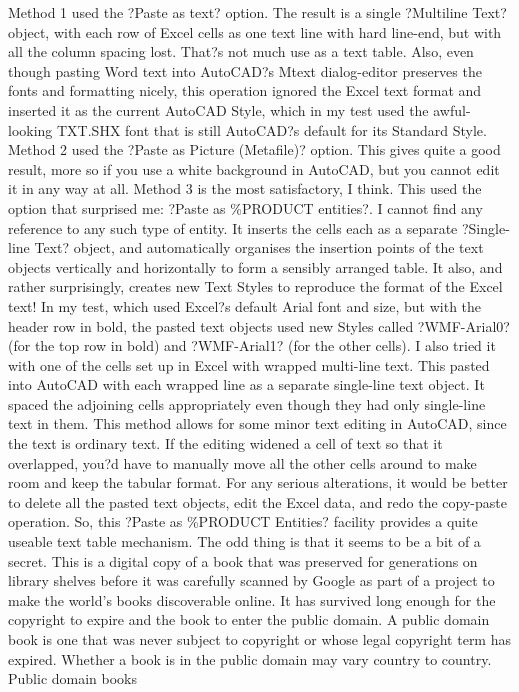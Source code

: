 \documentclass[a4paper]{article}
\begin{document}
Method 1 used the ?Paste as text? option. The result is a single ?Multiline Text? object, with each row of Excel cells as one text line with hard line-end, but with all the column spacing lost. That?s not much use as a text table. Also, even though pasting Word text into AutoCAD?s Mtext dialog-editor preserves the fonts and formatting nicely, this operation ignored the Excel text format and inserted it as the current AutoCAD Style, which in my test used the awful-looking TXT.SHX font that is still AutoCAD?s default for its Standard Style.
Method 2 used the ?Paste as Picture (Metafile)? option. This gives quite a good result, more so if you use a white background in AutoCAD, but you cannot edit it in any way at all. 
Method 3 is the most satisfactory, I think. This used the option that surprised me: ?Paste as \%PRODUCT entities?. I cannot find any reference to any such type of entity. It inserts the cells each as a separate ?Single-line Text? object, and automatically organises the insertion points of the text objects vertically and horizontally to form a sensibly arranged table. It also, and rather surprisingly, creates new Text Styles to reproduce the format of the Excel text! In my test, which used Excel?s default Arial font and size, but with the header row in bold, the pasted text objects used new Styles called ?WMF-Arial0? (for the top row in bold) and ?WMF-Arial1? (for the other cells).
I also tried it with one of the cells set up in Excel with wrapped multi-line text. This pasted into AutoCAD with each wrapped line as a separate single-line text object. It spaced the adjoining cells appropriately even though they had only single-line text in them.
This method allows for some minor text editing in AutoCAD, since the text is ordinary text. If the editing widened a cell of text so that it overlapped, you?d have to manually move all the other cells around to make room and keep the tabular format. For any serious alterations, it would be better to delete all the pasted text objects, edit the Excel data, and redo the copy-paste operation.
So, this ?Paste as \%PRODUCT Entities? facility provides a quite useable text table mechanism. The odd thing is that it seems to be a bit of a secret.
This is a digital copy of a book that was preserved for generations on library shelves before it was carefully scanned by Google as part of a project 
to make the world's books discoverable online. 
It has survived long enough for the copyright to expire and the book to enter the public domain. A public domain book is one that was never subject 
to copyright or whose legal copyright term has expired. Whether a book is in the public domain may vary country to country. Public domain books 
\end{document}
